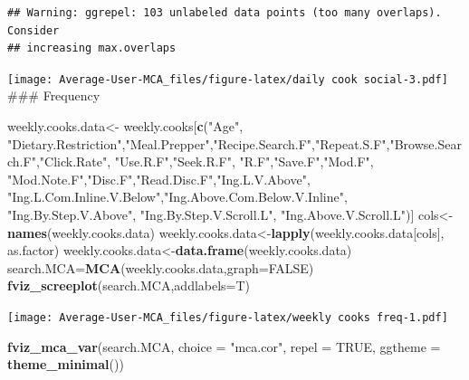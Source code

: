 \documentclass[
]{article}
\newenvironment{Shaded}{\begin{snugshade}}{\end{snugshade}}
\newcommand{\DataTypeTok}[1]{\textcolor[rgb]{0.13,0.29,0.53}{#1}}
\newcommand{\KeywordTok}[1]{\textcolor[rgb]{0.13,0.29,0.53}{\textbf{#1}}}
\newcommand{\NormalTok}[1]{#1}
\newcommand{\OtherTok}[1]{\textcolor[rgb]{0.56,0.35,0.01}{#1}}
\newcommand{\StringTok}[1]{\textcolor[rgb]{0.31,0.60,0.02}{#1}}
\begin{document}
\begin{verbatim}
## Warning: ggrepel: 103 unlabeled data points (too many overlaps). Consider
## increasing max.overlaps
\end{verbatim}

\texttt{[image: Average-User-MCA\_files/figure-latex/daily cook social-3.pdf]}
\#\#\# Frequency

\begin{Shaded}
\begin{Highlighting}[]
\NormalTok{weekly.cooks.data<-}\StringTok{ }\NormalTok{weekly.cooks[}\KeywordTok{c}\NormalTok{(}\StringTok{"Age"}\NormalTok{, }\StringTok{"Dietary.Restriction"}\NormalTok{,}\StringTok{"Meal.Prepper"}\NormalTok{,}\StringTok{"Recipe.Search.F"}\NormalTok{,}\StringTok{"Repeat.S.F"}\NormalTok{,}\StringTok{"Browse.Search.F"}\NormalTok{,}\StringTok{"Click.Rate"}\NormalTok{,}
            \StringTok{"Use.R.F"}\NormalTok{,}\StringTok{"Seek.R.F"}\NormalTok{, }\StringTok{"R.F"}\NormalTok{,}\StringTok{"Save.F"}\NormalTok{,}\StringTok{"Mod.F"}\NormalTok{, }\StringTok{"Mod.Note.F"}\NormalTok{,}\StringTok{"Disc.F"}\NormalTok{,}\StringTok{"Read.Disc.F"}\NormalTok{,}\StringTok{"Ing.L.V.Above"}\NormalTok{,}
            \StringTok{"Ing.L.Com.Inline.V.Below"}\NormalTok{,}\StringTok{"Ing.Above.Com.Below.V.Inline"}\NormalTok{,  }\StringTok{"Ing.By.Step.V.Above"}\NormalTok{,  }\StringTok{"Ing.By.Step.V.Scroll.L"}\NormalTok{,}
            \StringTok{"Ing.Above.V.Scroll.L"}\NormalTok{)]}
\NormalTok{cols<-}\KeywordTok{names}\NormalTok{(weekly.cooks.data)}
\NormalTok{weekly.cooks.data<-}\KeywordTok{lapply}\NormalTok{(weekly.cooks.data[cols], as.factor)}
\NormalTok{weekly.cooks.data<-}\KeywordTok{data.frame}\NormalTok{(weekly.cooks.data)}
\NormalTok{search.MCA=}\KeywordTok{MCA}\NormalTok{(weekly.cooks.data,}\DataTypeTok{graph=}\OtherTok{FALSE}\NormalTok{)}
\KeywordTok{fviz_screeplot}\NormalTok{(search.MCA,}\DataTypeTok{addlabels=}\NormalTok{T)}
\end{Highlighting}
\end{Shaded}

\texttt{[image: Average-User-MCA\_files/figure-latex/weekly cooks freq-1.pdf]}

\begin{Shaded}
\begin{Highlighting}[]
\KeywordTok{fviz_mca_var}\NormalTok{(search.MCA, }\DataTypeTok{choice =} \StringTok{"mca.cor"}\NormalTok{, }\DataTypeTok{repel =} \OtherTok{TRUE}\NormalTok{,}
             \DataTypeTok{ggtheme =} \KeywordTok{theme_minimal}\NormalTok{())}
\end{Highlighting}
\end{Shaded}
\end{document}
